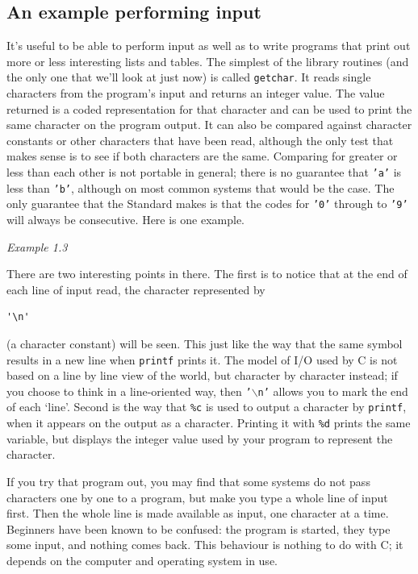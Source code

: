   

  \subsection{An example performing input}
   

   It's useful to be able to perform input as well as to write programs
    that print out more or less interesting lists and tables. The simplest of
    the library routines (and the only one that we'll look at just now) is
    called \texttt{getchar}. It reads single characters from the program's
    input and returns an integer value. The value returned is a coded
    representation for that character and can be used to print the same
    character on the program output. It can also be compared against character
    constants or other characters that have been read, although the only test
    that makes sense is to see if both characters are the same. Comparing for
    greater or less than each other is not portable in general; there is no
    guarantee that \texttt{'a'} is less than \texttt{'b'}, although on
    most common systems that would be the case. The only guarantee that the
    Standard makes is that the codes for \texttt{'0'} through to
    \texttt{'9'} will always be consecutive. Here is one example.


   \begin{center}\textit{Example 1.3}\end{center}


   There are two interesting points in there. The first is to notice that
    at the end of each line of input read, the character represented by


   \begin{Verbatim}
'\n'
\end{Verbatim}

   (a character constant) will be seen. This just like the way that the
    same symbol results in a new line when \texttt{printf} prints it. The
    model of I/O used by C is not based on a line by line view of the world,
    but character by character instead; if you choose to think in a
    line-oriented way, then \texttt{'$\backslash$n'} allows you to mark the end of
    each `line'. Second is the way that \texttt{\%c} is used to
    output a character by \texttt{printf}, when it appears on the output
    as a character. Printing it with \texttt{\%d} prints the same variable,
    but displays the integer value used by your program to represent the
    character.


   If you try that program out, you may find that some systems do not pass
    characters one by one to a program, but make you type a whole line of
    input first. Then the whole line is made available as input, one character
    at a time. Beginners have been known to be confused: the program is
    started, they type some input, and nothing comes back. This behaviour is
    nothing to do with C; it depends on the computer and operating system in
    use.


